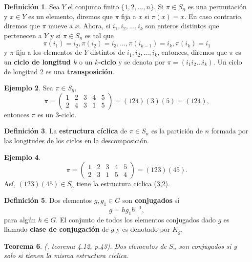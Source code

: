 \documentclass[12pt]{book}
\newtheorem{theorem}{Teorema}[section]
\theoremstyle{definition}
\newtheorem{definition}[theorem]{Definición}
\newtheorem{example}[theorem]{Ejemplo}
\newcounter{in}
\newcounter{ini}
\begin{document}
\begin{definition}
  \label{trans}
  Sea $Y$ el conjunto finito $\{1,2,\ldots,n\}$. Si $\pi\in S_{n}$ es una permutación y
  $x\in Y$ es un elemento, diremos que $\pi$ fija a $x$ si
  $\pi(x)=x$. En caso contrario, diremos que $\pi$ mueve a $x$. Ahora,
  si $i_{1},i_{2},\ldots, i_{k}$ son enteros distintos que pertenecen a
  $Y$ y si $\pi\in S_{n}$ es tal que
  $$\pi(i_{1})=i_{2},\pi(i_{2})=i_{3},\ldots,\pi(i_{k-1})=i_{k},\pi(i_{k})=i_{1}$$
  y $\pi$ fija a los elementos de $Y$ distintos de
  $i_{1},i_{2},\ldots,i_{k}$, entonces,
  diremos que $\pi$ es un \textbf{ciclo de longitud $k$} o un
  \textbf{$k$-ciclo} y se denota por $\pi=(i_{1}i_{2}\dots i_{k})$. Un
  ciclo de longitud 2 es una \textbf{transposición}.
\end{definition}

\begin{example}
  Sea $\pi\in S_{5}$, 
  \[\pi=\left(
    \begin{array}{ccccc}
      1 & 2 & 3 & 4 & 5\\
      2 & 4 & 3 & 1 & 5  
    \end{array} 
  \right)=(124)(3)(5)=(124),\]
  entonces $\pi$ es un 3-ciclo.
\end{example}

\begin{definition}
  La \textbf{estructura cíclica} de $\pi\in S_{n}$ es la partición de
  $n$ formada por las longitudes de los ciclos en la descomposición.
\end{definition}

\begin{example}
  \[\pi=\left(
    \begin{array}{ccccc}
      1 & 2 & 3 & 4 & 5\\
      2 & 3 & 1 & 5 & 4  
    \end{array} 
  \right)=(123)(45).\]
  Así, $(123)(45)\in S_{5}$ tiene la estructura cíclica (3,2). 
\end{example}

\begin{definition}
  Dos elementos $g,g_{1}\in G$ son \textbf{conjugados} si
  \begin{equation*}
  g=hg_{1}h^{-1},
\end{equation*}
para algún $h\in G$. El conjunto de todos los elementos conjugados
dado $g$ es llamado \textbf{clase de conjugación} de $g$ y es
denotado por $K_{g}$.
\end{definition}

\begin{theorem}{\normalfont (\cite{zaldivar}, teorema 4.12, p.43)}.
  Dos elementos de $S_{n}$ son conjugados si y solo si tienen la misma
  estructura cíclica.   
\end{theorem}
\end{document}
